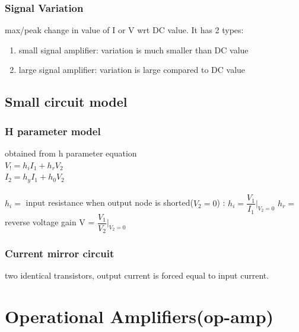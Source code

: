 \documentclass[10pt, a4paper]{report}
\begin{document}
	\subsection{Signal Variation}
	max/peak change in value of I or V wrt DC value. It has 2 types:
	\begin{enumerate}
		\item small signal amplifier: variation is much smaller than DC value
		\item large signal amplifier: variation is large compared to DC value
	\end{enumerate}

	\section{Small circuit model}
	\subsection{H parameter model}
	obtained from h parameter equation\\
	$ V_! = h_i I_1 + h_r V_2 $ \\
	$ I_2 = h_y I_1 + h_0 V_2 $ \\\\
	
	$ h_i =  $ input resistance when output node is shorted($ V_2 = 0 $) : $ h_i = \dfrac{V_1}{I_1}|_{V_2=0} $
	$ h_r =  $ reverse voltage gain V = $ \dfrac{V_1}{V_2}|_{V_2 = 0} $
	
	\subsection{Current mirror circuit}
	two identical transistors, output current is forced equal to input current.\\
	
	
	\chapter{Operational Amplifiers(op-amp)}

	
\end{document}
